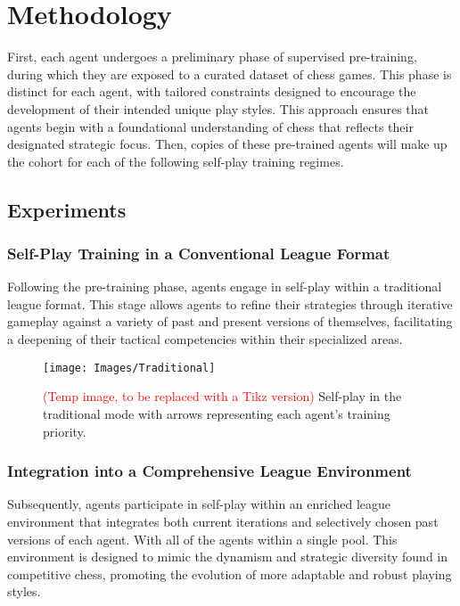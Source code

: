 \documentclass[journal]{IEEEtran}
\begin{document}
	
	\section{Methodology}
	\label{sec:methodology}
	
	First, each agent undergoes a preliminary phase of supervised pre-training, 
	during which they are exposed to a curated dataset of chess games. 
	This phase is distinct for each agent, with tailored constraints designed to encourage the development of their intended unique play styles. 
	This approach ensures that agents begin with a foundational understanding of chess that reflects their designated strategic focus.	
	Then, copies of these pre-trained agents will make up the cohort for each of the following self-play training regimes.
	
	\subsection{Experiments}
	
	\subsubsection{Self-Play Training in a Conventional League Format}
	Following the pre-training phase, agents engage in self-play within a traditional league format. 
	This stage allows agents to refine their strategies through iterative gameplay against a variety of past and present versions of themselves,
	facilitating a deepening of their tactical competencies within their specialized areas.
	
	\begin{figure}
		\centering
		\texttt{[image: Images/Traditional]}
		\caption{\textcolor{red}{(Temp image, to be replaced with a Tikz version)} Self-play in the traditional mode with arrows representing each agent's training priority.}
		\label{fig:traditional}
	\end{figure}

	
	\subsubsection{Integration into a Comprehensive League Environment} 
	Subsequently, agents participate in self-play within an enriched league environment that 
	integrates both current iterations and selectively chosen past versions of each agent.
	With all of the agents within a single pool.
	This environment is designed to mimic the dynamism and strategic diversity found in competitive chess, 
	promoting the evolution of more adaptable and robust playing styles.
\end{document}
